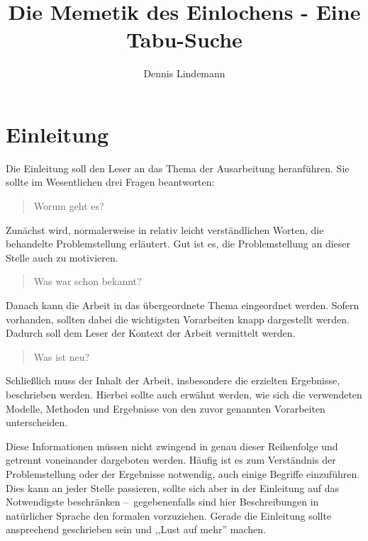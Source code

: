 \documentclass[draft]{tcs-seminar}
\begin{document}
\title{Die Memetik des Einlochens - Eine Tabu-Suche}
\author{Dennis Lindemann}

\begin{abstract}

\end{abstract}

\maketitle


\section{Einleitung}

Die Einleitung soll den Leser an das Thema der Ausarbeitung heranführen.
Sie sollte im Wesentlichen drei Fragen beantworten:

\begin{quote}
  Worum geht es?
\end{quote}
Zunächst wird, normalerweise in relativ leicht verständlichen Worten,
die behandelte Problemstellung erläutert.
Gut ist es, die Problemstellung an dieser Stelle auch zu motivieren.

\begin{quote}
  Was war schon bekannt?
\end{quote}
Danach kann die Arbeit in das übergeordnete Thema eingeordnet werden.
Sofern vorhanden, sollten dabei
die wichtigsten Vorarbeiten knapp dargestellt werden.
Dadurch soll dem Leser der Kontext der Arbeit vermittelt werden.

\begin{quote}
  Was ist neu?
\end{quote}
Schließlich muss der Inhalt der Arbeit,
insbesondere die erzielten Ergebnisse, beschrieben werden.
Hierbei sollte auch erwähnt werden,
wie sich die verwendeten Modelle, Methoden und Ergebnisse
von den zuvor genannten Vorarbeiten unterscheiden.

Diese Informationen müssen nicht zwingend
in genau dieser Reihenfolge und getrennt voneinander dargeboten werden.
Häufig ist es zum Verständnis der Problemstellung
oder der Ergebnisse notwendig, auch einige Begriffe einzuführen.
Dies kann an jeder Stelle passieren,
sollte sich aber in der Einleitung auf das Notwendigste beschränken
--~gegebenenfalls sind hier Beschreibungen in natürlicher Sprache
den formalen vorzuziehen.
Gerade die Einleitung sollte ansprechend geschrieben sein
und ,,Lust auf mehr'' machen.
\end{document}
